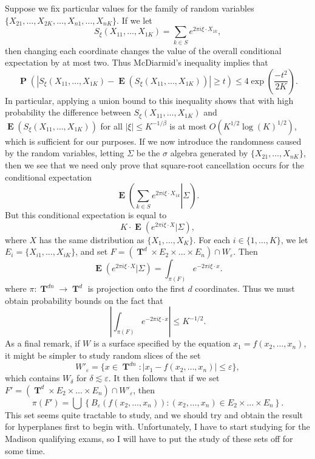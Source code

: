 \documentclass[openany,nobib,nols,a4paper,twoside,symmetric,justified,notoc]{tufte-book}
\theoremstyle{plain}
\theoremstyle{remark}
\theoremstyle{definition}
\DeclareMathOperator{\TT}{\mathbf{T}}
\DeclareMathOperator{\EE}{\mathbf{E}}
\DeclareMathOperator{\PP}{\mathbf{P}}
\begin{document}
Suppose we fix particular values for the family of random variables $\{ X_{21}, \dots, X_{2K}, \dots, X_{n1}, \dots, X_{nK} \}$. If we let
%
\[ S_\xi(X_{11}, \dots, X_{1K}) = \sum_{k \in S} e^{2 \pi i \xi \cdot X_{1k}}, \]
%
then changing each coordinate changes the value of the overall conditional expectation by at most two. Thus McDiarmid's inequality implies that
%
\[ \PP \left( |S_\xi(X_{11}, \dots, X_{1K}) - \EE(S_\xi(X_{11}, \dots, X_{1K}))| \geq t \right) \leq 4 \exp \left( \frac{-t^2}{2K} \right). \]
%
In particular, applying a union bound to this inequality shows that with high probability the difference between $S_\xi(X_{11}, \dots, X_{1K})$ and $\EE(S_\xi(X_{11}, \dots, X_{1K}))$ for all $|\xi| \leq K^{-1/\beta}$ is at most $O(K^{1/2} \log(K)^{1/2})$, which is sufficient for our purposes. If we now introduce the randomness caused by the random variables, letting $\Sigma$ be the $\sigma$ algebra generated by $\{ X_{21}, \dots, X_{nK} \}$, then we see that we need only prove that square-root cancellation occurs for the conditional expectation
%
\[ \EE \left. \left( \sum_{k \in S} e^{2 \pi i \xi \cdot X_{1k}} \right| \Sigma \right). \]
%
But this conditional expectation is equal to
%
\[ K \cdot \EE \left( e^{2 \pi i \xi \cdot X} | \Sigma \right), \]
%
where $X$ has the same distribution as $\{ X_1, \dots, X_K \}$. For each $i \in \{ 1, \dots, K \}$, we let $E_i = \{ X_{i1}, \dots, X_{iK} \}$, and set $F = (\TT^d \times E_2 \times \dots \times E_n) \cap W_\varepsilon$. Then
%
\[ \EE \left( e^{2 \pi i \xi \cdot X} | \Sigma \right) = \int_{\pi(F)} e^{-2 \pi i \xi \cdot x}. \]
%
where $\pi: \TT^{dn} \to \TT^d$ is projection onto the first $d$ coordinates. Thus we must obtain probability bounds on the fact that
%
\[ \left| \int_{\pi(F)} e^{-2 \pi i \xi \cdot x} \right| \leq K^{-1/2}. \]
%
As a final remark, if $W$ is a surface specified by the equation $x_1 = f(x_2, \dots, x_n)$, it might be simpler to study random slices of the set
%
\[ W'_\varepsilon = \{ x \in \TT^{dn} : |x_1 - f(x_2, \dots, x_n)| \leq \varepsilon \}, \]
%
which contains $W_\delta$ for $\delta \lesssim \varepsilon$. It then follows that if we set $F' = (\TT^d \times E_2 \times \dots \times E_n) \cap W'_\varepsilon$, then
%
\[ \pi(F') = \bigcup \left\{ B_\varepsilon(f(x_2, \dots, x_n)) : (x_2, \dots, x_n) \in E_2 \times \dots \times E_n \right\}. \]
%
This set seems quite tractable to study, and we should try and obtain the result for hyperplanes first to begin with. Unfortunately, I have to start studying for the Madison qualifying exams, so I will have to put the study of these sets off for some time.
\end{document}
